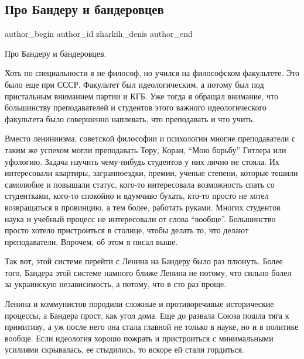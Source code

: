  
 
 
 
 
 
\subsection{Про Бандеру и бандеровцев}
\label{sec:03_01_2022.fb.zharkih_denis.1.pro_banderu}
 
\ifcmt
 author_begin
   author_id zharkih_denis
 author_end
\fi

Про Бандеру и бандеровцев.

Хоть по специальности я не философ, но учился на философском факультете. Это
было еще при СССР. Факультет был идеологическим, а потому был под пристальным
вниманием партии и КГБ. Уже тогда я обращал внимание, что большинству
преподавателей и студентов этого важного идеологического факультета было
совершенно наплевать, что преподавать и что учить. 

Вместо ленининзма, советской философии и психологии многие преподаватели с
таким же успехом могли преподавать Тору, Коран, \enquote{Мою борьбу} Гитлера или
уфологию. Задача научить чему-нибудь студентов у них лично не стояла. Их
интересовали квартиры, загранпоездки, премии, ученые степени, которые тешили
самолюбие и повышали статус, кого-то интересовала возможность спать со
студентками, кого-то спокойно и вдумчиво бухать, кто-то просто не хотел
возвращаться в провинцию, а тем более, работать руками. Многих студентов наука
и учебный процесс не интересовали от слова \enquote{вообще}. Большинство просто хотело
пристроиться в столице, чтобы делать то, что делают преподаватели. Впрочем, об
этом я писал выше. 

Так вот, этой системе перейти с Ленина на Бандеру было раз плюнуть. Более того,
Бандера этой системе намного ближе Ленина не потому, что сильно болел за
украинскую независимость, а потому, что в сто раз проще. 

Ленина и коммунистов породили сложные и противоречивые исторические процессы, а
Бандера прост, как угол дома. Еще до развала Союза пошла тяга к примитиву, а уж
после него она стала главной не только в науке, но и в политике вообще. Если
идеология хорошо пожрать и пристроиться с минимальными усилиями скрывалась, ее
стыдились, то вскоре ей стали гордиться. 

